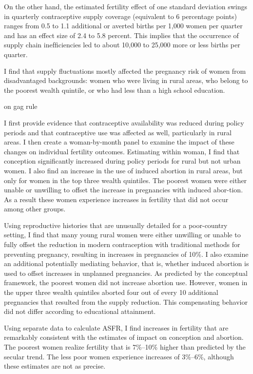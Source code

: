\documentclass[letterpaper,12pt]{article}
\begin{document}
On the other hand, the estimated fertility effect of one standard
deviation swings in quarterly contraceptive supply coverage (equivalent
to 6 percentage points) ranges from 0.5 to 1.1 additional or averted
births per 1,000 women per quarter and has an effect size of 2.4 to 5.8
percent. This implies that the occurrence of supply chain inefﬁciencies
led to about 10,000 to 25,000 more or less births per quarter.

I ﬁnd that supply ﬂuctuations mostly affected the pregnancy risk of
women from disadvantaged backgrounds: women who were living in rural
areas, who belong to the poorest wealth quintile, or who had less than a
high school education.

\citet{Jones2015} on gag rule

I ﬁrst provide evidence that contraceptive availability was reduced
during policy periods and that contraceptive use was affected as well,
particularly in rural areas. I then create a woman-by-month panel to
examine the impact of these changes on individual fertility outcomes.
Estimating within woman, I ﬁnd that conception signiﬁcantly increased
during policy periods for rural but not urban women. I also ﬁnd an
increase in the use of induced abortion in rural areas, but only for
women in the top three wealth quintiles. The poorest women were either
unable or unwilling to offset the increase in pregnancies with induced
abor-tion. As a result these women experience increases in fertility
that did not occur among other groups.

Using reproductive histories that are unusually detailed for a
poor-country setting, I ﬁnd that many young rural women were either
unwilling or unable to fully offset the reduction in modern
contraception with traditional methods for preventing pregnancy,
resulting in increases in pregnancies of 10\%. I also examine an
additional potentially mediating behavior, that is, whether induced
abortion is used to offset increases in unplanned pregnancies. As
predicted by the conceptual framework, the poorest women did not
increase abortion use. However, women in the upper three wealth
quintiles aborted four out of every 10 additional pregnancies that
resulted from the supply reduction. This compensating behavior did not
differ according to educational attainment.

Using separate data to calculate ASFR, I ﬁnd increases in fertility that
are remarkably consistent with the estimates of impact on conception and
abortion. The poorest women realize fertility that is 7\%–10\% higher than
predicted by the secular trend. The less poor women experience increases
of 3\%–6\%, although these estimates are not as precise.
\end{document}
